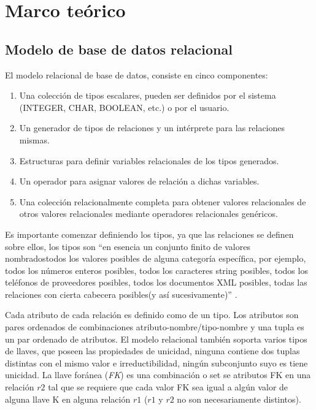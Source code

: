 \section {Marco teórico}\label{sec:marco}
\subsection {Modelo de base de datos relacional}\label{subsec:rdb}
El modelo relacional de base de datos, consiste en cinco componentes:
\begin{enumerate}
	\item Una colección de tipos escalares, pueden ser definidos por el sistema (INTEGER, CHAR, BOOLEAN, etc.) o por el usuario.
	\item Un generador de tipos de relaciones y un intérprete para las relaciones mismas.
	\item Estructuras para definir variables relacionales de los tipos generados.
	\item Un operador para asignar valores de relación a dichas variables.
	\item Una colección relacionalmente completa para obtener valores relacionales de otros valores relacionales mediante operadores relacionales genéricos.
\end{enumerate}
Es importante comenzar definiendo los tipos, ya que las relaciones se definen sobre ellos, los tipos son ``en esencia un conjunto finito de valores nombrados\textemdash todos los valores posibles de alguna categoría específica, por ejemplo, todos los números enteros posibles, todos los caracteres string posibles, todos los teléfonos de proveedores posibles, todos los documentos XML posibles, todas las relaciones con cierta cabecera posibles(y así sucesivamente)'' \cite{date12}.

Cada atributo de cada relación es definido como de un tipo. Los atributos son pares ordenados de combinaciones atributo-nombre/tipo-nombre y una tupla es un par ordenado de atributos.
El modelo relacional también soporta varios tipos de llaves, que poseen las propiedades de unicidad, ninguna contiene dos tuplas distintas con el mismo valor e irreductibilidad, ningún subconjunto suyo es tiene unicidad. La llave foránea (\emph{FK}) es una combinación o set se atributos FK en una relación $r2$ tal que se requiere que cada valor FK sea igual a algún valor de alguna llave K en alguna relación $r1$ ($r1$ y $r2$ no son necesariamente distintos).

